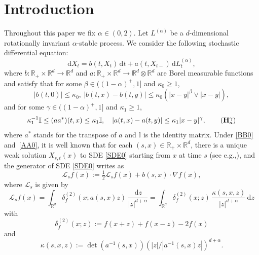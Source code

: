 \documentclass[11pt]{article}
\newcommand{\eg}{e.g.,\xspace}
\numberwithin{equation}{section}\providecommand{\asymp}{\mathrel{\sim}}
\newcommand{\rd}{\mathrm{d}}
\theoremstyle{plain}
\theoremstyle{definition}
\newcommand\cL{{\mathcal L}}
\newcommand\mI{\mathbb{I}}
\newcommand\mR{\mathbb{R}}
\newcommand\1{{\mathbf{1}}}
\newcommand\sL{{\mathscr L}}
\newcommand{\dif}{\,\mathrm{d}}
\begin{document}
\section{Introduction}

Throughout this paper we fix $\alpha\in(0,2)$. Let $L^{(\alpha)}$ be a $d$-dimensional rotationally invariant $\alpha$-stable process.
We consider the following stochastic differential equation:
\begin{equation}\label{SDE0}
\rd X_t=b(t,X_t)\dif t+a(t,X_{t-})\dif L^{(\alpha)}_t,
\end{equation}
where $b:\mR_+\times\mR^d\to\mR^d$ and $a:\mR_+\times\mR^d\to\mR^d\otimes\mR^d$ are Borel measurable functions and satisfy
that for some $\beta\in((1-\alpha)^+,1]$ and $\kappa_0\geq 1$,
\begin{equation}\label{BB0}
|b(t,0)|\le \kappa_0,\ |b(t,x)-b(t,y)|\leq\kappa_0(|x-y|^\beta\vee|x-y|),\tag{$\mathbf H^\beta_b$}
\end{equation}
and
for some $\gamma\in((1-\alpha)^+,1]$ and $\kappa_1\geq 1$,
\begin{equation}\label{AA0}
\kappa_1^{-1}\mI\leq (aa^*)(t,x)\leq\kappa_1\mI,\quad |a(t,x)-a(t,y)|\leq\kappa_1|x-y|^{\gamma}, \tag{$\mathbf H^{\gamma}_a$}
\end{equation}
where $a^*$ stands for the transpose of $a$ and $\mI$ is the identity matrix.
Under \eqref{BB0} and~\eqref{AA0}, it is well known that
for each $(s,x)\in\mR_+\times\mR^d$,
there is a unique weak solution
$X_{s,t}(x)$ to SDE \eqref{SDE0} starting from $x$ at time $s$ (see \eg \cite[Th.\,1.1]{CZZ}),
and the generator of SDE \eqref{SDE0} writes as
\begin{equation*}
\sL_{s} f(x):=\tfrac12\cL_{s} f(x)+b(s,x)\cdot\nabla f(x),
\end{equation*}
where $\cL_{s}$ is given by\vspace*{-3pt}
\begin{equation}\label{GEN_STABLE_LIKE}
\cL_{s} f(x)=\int_{\mR^d}\delta^{(2)}_f(x;a(s,x)z)\,\frac{\dif z}{|z|^{d+\alpha}}=\int_{\mR^d}\delta^{(2)}_f(x;z)\,\frac{\kappa(s,x,z)}{|z|^{d+\alpha}}\,\rd z
\end{equation}
with\vspace*{-3pt}
\begin{equation}\label{DEF_DELTA_2}
\delta^{(2)}_f(x;z):=f(x+z)+f(x-z)-2f(x)
\end{equation}
and\vspace*{-3pt}
\begin{equation}\label{KA1}
\kappa(s,x,z):=\det(a^{-1}(s,x))(|z|/|a^{-1}(s,x)z|)^{d+\alpha}.
\end{equation}
\end{document}
